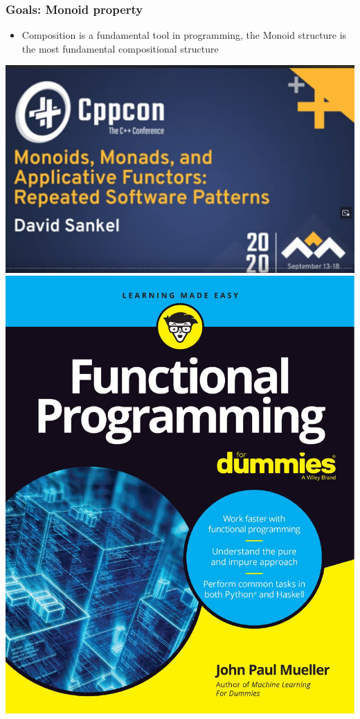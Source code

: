 \begin{frame}[t]
	\frametitle{Goals: Monoid property}
	\begin{itemize}
		\item Composition is a fundamental tool in programming, the Monoid structure is the most fundamental compositional structure
	\end{itemize}

	\includegraphics[height=0.2\textwidth]{./images/ccpconMonoids.png}
	\includegraphics[height=0.2\textwidth]{./images/FunctionalProgrammingForDummies.jpeg}
\end{frame}
